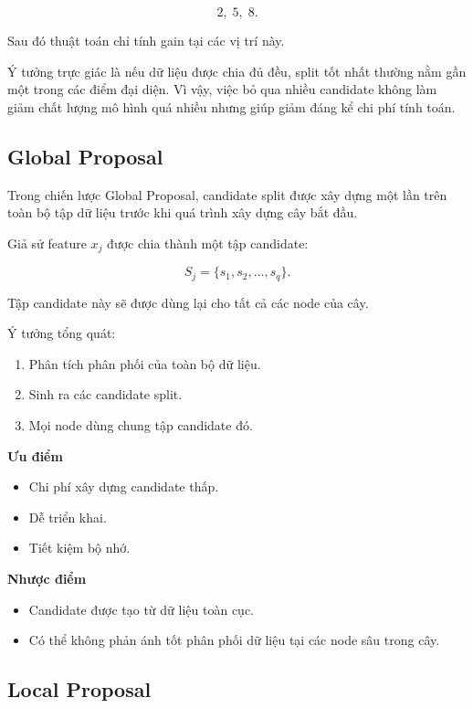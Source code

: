 \[
2,\;5,\;8.
\]

Sau đó thuật toán chỉ tính gain tại các vị trí này.

Ý tưởng trực giác là nếu dữ liệu được chia đủ đều, split tốt nhất thường nằm gần một trong các điểm đại diện. Vì vậy, việc bỏ qua nhiều candidate không làm giảm chất lượng mô hình quá nhiều nhưng giúp giảm đáng kể chi phí tính toán.

\subsection{Global Proposal}

Trong chiến lược Global Proposal, candidate split được xây dựng một lần trên toàn bộ tập dữ liệu trước khi quá trình xây dựng cây bắt đầu.

Giả sử feature $x_j$ được chia thành một tập candidate:

\[
S_j = \{s_1, s_2, \ldots, s_q\}.
\]

Tập candidate này sẽ được dùng lại cho tất cả các node của cây.

Ý tưởng tổng quát:

\begin{enumerate}
    \item Phân tích phân phối của toàn bộ dữ liệu.
    \item Sinh ra các candidate split.
    \item Mọi node dùng chung tập candidate đó.
\end{enumerate}

\textbf{Ưu điểm}

\begin{itemize}
    \item Chi phí xây dựng candidate thấp.
    \item Dễ triển khai.
    \item Tiết kiệm bộ nhớ.
\end{itemize}

\textbf{Nhược điểm}

\begin{itemize}
    \item Candidate được tạo từ dữ liệu toàn cục.
    \item Có thể không phản ánh tốt phân phối dữ liệu tại các node sâu trong cây.
\end{itemize}

\subsection{Local Proposal}

